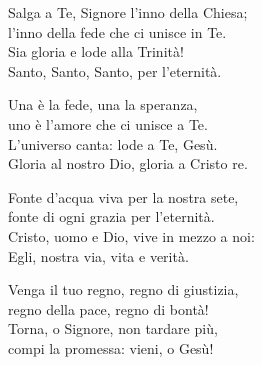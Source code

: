 
\strofa Salga a Te, Signore l'inno della Chiesa;\\
l'inno della fede che ci unisce in Te.\\
Sia gloria e lode alla Trinità!\\
Santo, Santo, Santo, per l'eternità.

\spazio

\strofa Una è la fede, una la speranza,\\
uno è l'amore che ci unisce a Te.\\
L'universo canta: lode a Te, Gesù.\\
Gloria al nostro Dio, gloria a Cristo re.

\spazio

\strofa Fonte d'acqua viva per la nostra sete,\\
fonte di ogni grazia per l'eternità.\\
Cristo, uomo e Dio, vive in mezzo a noi:\\
Egli, nostra via, vita e verità.

\spazio

\strofa Venga il tuo regno, regno di giustizia,\\
regno della pace, regno di bontà!\\
Torna, o Signore, non tardare più,\\
compi la promessa: vieni, o Gesù!